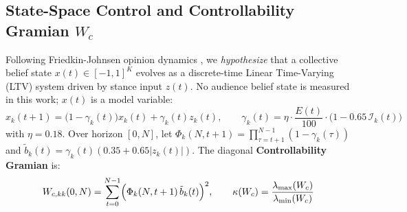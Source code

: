 \documentclass[10pt,letterpaper]{article}
\begin{document}
\subsection{State-Space Control and Controllability Gramian \texorpdfstring{$W_c$}{W\_c}}
Following Friedkin-Johnsen opinion dynamics \cite{Friedkin1990}, we \emph{hypothesize} that a collective belief state $x(t) \in [-1, 1]^K$ evolves as a discrete-time Linear Time-Varying (LTV) system driven by stance input $z(t)$. No audience belief state is measured in this work; $x(t)$ is a model variable:
\begin{equation}
  x_k(t+1) = \bigl(1 - \gamma_k(t)\bigr) x_k(t) + \gamma_k(t) z_k(t), \qquad
  \gamma_k(t) = \eta \cdot \frac{E(t)}{100} \cdot \bigl(1 - 0.65\,\mathcal{I}_k(t)\bigr)
\end{equation}
with $\eta = 0.18$. Over horizon $[0, N]$, let $\Phi_k(N, t+1) = \prod_{\tau=t+1}^{N-1} (1 - \gamma_k(\tau))$ and $\tilde{b}_k(t) = \gamma_k(t)(0.35 + 0.65|z_k(t)|)$. The diagonal \textbf{Controllability Gramian} is:
\begin{equation}
  W_{c,kk}(0, N) = \sum_{t=0}^{N-1} \Bigl(\Phi_k(N, t+1)\,\tilde{b}_k(t)\Bigr)^2, \qquad
  \kappa(W_c) = \frac{\lambda_{\max}(W_c)}{\lambda_{\min}(W_c)}
\end{equation}

\begin{table}[!htbp]
\centering
\caption{Results Across Speaker Turns in \texttt{CORPUS-001} (\emph{Insumisi\'on Debate}, Spain, 1994, $194.84\text{ s}$, $N=39$).}
\label{tab:exp001}
\small
{}
\end{table}
\end{document}
